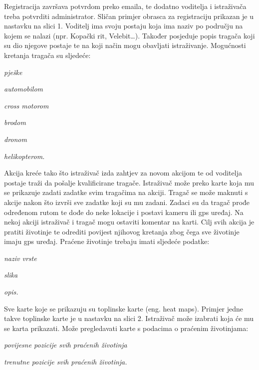 		Registracija završava potvrdom preko emaila, te dodatno voditelja i istraživača treba potvrditi administrator. Sličan primjer obrasca za registraciju prikazan je u nastavku na slici 1.
		Voditelj ima svoju postaju koja ima naziv po području na kojem se nalazi (npr. Kopački rit, Velebit…). Također posjeduje popis tragača koji su dio njegove postaje te na koji način mogu obavljati istraživanje. Mogućnosti kretanja tragača su sljedeće:
		\begin{packed_item}
			\item \textit{pješke}
			\item \textit{automobilom}
			\item \textit{cross motorom}
			\item \textit{brodom}
			\item \textit{dronom}
			\item \textit{helikopterom.}
		\end{packed_item}
		
		Akcija kreće tako što istraživač izda zahtjev za novom akcijom te od voditelja postaje traži da pošalje kvalificirane tragače. Istraživač može preko karte koja mu se prikazuje zadati zadatke svim tragačima na akciji. Tragač se može maknuti s akcije nakon što izvrši sve zadatke koji su mu zadani.
		Zadaci su da tragač prođe određenom rutom te dođe do neke lokacije i postavi kameru ili gps uređaj. Na nekoj akciji istraživač i tragač mogu ostaviti komentar na karti.
		Cilj svih akcija je pratiti životinje te odrediti povijest njihovog kretanja zbog čega sve životinje imaju gps uređaj. Praćene životinje trebaju imati sljedeće podatke:
		\begin{packed_item}
			\item \textit{naziv vrste}
			\item \textit{slika}
			\item \textit{opis.}
		\end{packed_item}
		
		Sve karte koje se prikazuju su toplinske karte (eng. heat maps). Primjer jedne takve toplinske karte je u nastavku na slici 2.
		Istraživač može izabrati koja će mu se karta prikazati. Može pregledavati karte s podacima o praćenim životinjama:
		\begin{packed_item}
			\item \textit{povijesne pozicije svih praćenih životinja }
			\item \textit{trenutne pozicije svih praćenih životinja.}
		\end{packed_item}
		
